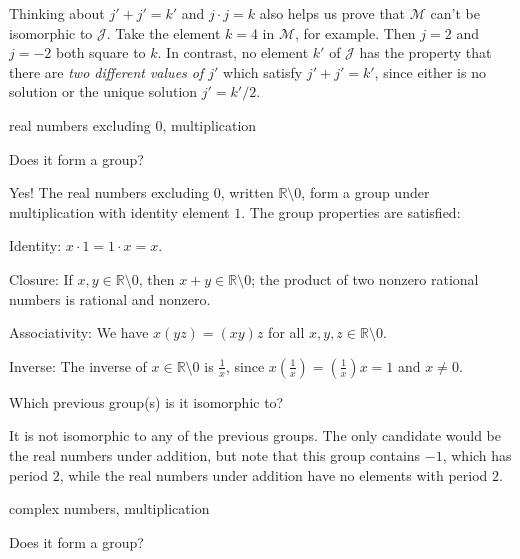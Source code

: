 \documentclass[../key.tex]{subfiles}
\begin{document}
Thinking about $j'+j'=k'$ and $j\cdot j=k$ also helps us prove that $\mathcal{M}$ can't be isomorphic to $\mathcal{J}$. Take the element $k=4$ in $\mathcal{M}$, for example. Then $j=2$ and $j=-2$ both square to $k$. In contrast, no element $k'$ of $\mathcal{J}$ has the property that there are \emph{two different values of $j'$} which satisfy $j'+j'=k'$, since either is no solution or the unique solution $j'=k'/2$.

\begin{inner_problem}
\item real numbers excluding $0$, multiplication
\end{inner_problem}

\begin{iinner_problem}[start=1]
\item Does it form a group?
\end{iinner_problem}

\noindent Yes! The real numbers excluding $0$, written $\mathbb{R} \setminus {0}$, form a group under multiplication with identity element $1$. The group properties are satisfied:

Identity: $x\cdot 1=1\cdot x=x$.

Closure: If $x,y\in \mathbb{R} \setminus {0}$, then $x+y\in \mathbb{R} \setminus {0}$; the product of two nonzero rational numbers is rational and nonzero.

Associativity: We have $x(yz)=(xy)z$ for all $x,y,z \in \mathbb{R} \setminus {0}$.

Inverse: The inverse of $x\in \mathbb{R} \setminus {0}$ is $\frac{1}{x}$, since $x\left(\frac{1}{x}\right)=\left(\frac{1}{x}\right)x=1$ and $x\neq 0$.

\begin{iinner_problem}
\item Which previous group(s) is it isomorphic to?
\end{iinner_problem}

\noindent It is not isomorphic to any of the previous groups. The only candidate would be the real numbers under addition, but note that this group contains $-1$, which has period $2$, while the real numbers under addition have no elements with period $2$.

\begin{inner_problem}
\item complex numbers, multiplication
\end{inner_problem}

\begin{iinner_problem}[start=1]
\item Does it form a group?
\end{iinner_problem}
\end{document}
